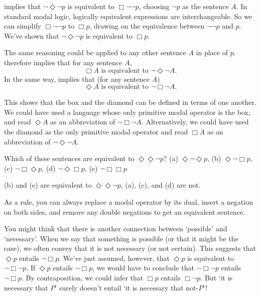  implies that $\neg\Diamond\neg p$ is equivalent to $\Box\neg\neg p$,
choosing $\neg p$ as the sentence $A$. In standard modal logic, logically
equivalent expressions are interchangeable.\label{claim:replacement} So we can
simplify $\Box \neg\neg p$ to $\Box p$, drawing on the equivalence between
$\neg\neg p$ and $p$. We've shown that $\neg\Diamond\neg p$ is equivalent to
$\Box p$.


The same reasoning could be applied to any other sentence $A$ in place of
$p$.  therefore implies that for any sentence $A$,
\[
   \Box A\text{ is equivalent to }\neg\Diamond\neg A.
\]
In the same way,  implies that (for any sentence $A$)
\[
   \Diamond A\text{ is equivalent to }\neg\Box\neg A.
\]


This shows that the box and the diamond can be defined in terms of one another.
We could have used a language whose only primitive modal operator is the box,
and read $\Diamond A$ as an abbreviation of $\neg\Box\neg A$. Alternatively, we
could have used the diamond as the only primitive modal operator and read
$\Box A$ as an abbreviation of $\neg\Diamond\neg A$.

\begin{exercise}
  Which of these sentences are equivalent to $\Diamond\Diamond \neg p$? (a)
  $\Diamond \neg \Diamond p$, (b) $\Diamond\neg \Box p$, (c)
  $\neg\Box\Diamond p$, (d) $\neg\Diamond\Box p$, (e) $\neg\Box\Box p$
\end{exercise}
\begin{solution}
  (b) and (e) are equivalent to $\Diamond\Diamond \neg p$, (a), (c), and (d) are
  not.
  
  As a rule, you can always replace a modal operator by its dual, insert a
  negation on both sides, and remove any double negations to get an equivalent
  sentence.
\end{solution}


You might think that there is another connection between `possible' and
`necessary'. When we say that something is possible (or that it might be the
case), we often convey that it is not necessary (or not certain). This suggests
that $\Diamond p$ entails $\neg \Box p$. We've just assumed, however, that
$\Diamond p$ is equivalent to $\neg \Box \neg p$. If $\Diamond p$ entails
$\neg \Box p$, we would have to conclude that $\neg\Box\neg p$ entails
$\neg\Box p$. By contraposition, we could infer that $\Box p$ entails
$\Box \neg p$. But `it is necessary that $P$' surely doesn't entail `it is
necessary that not-$P$'!

